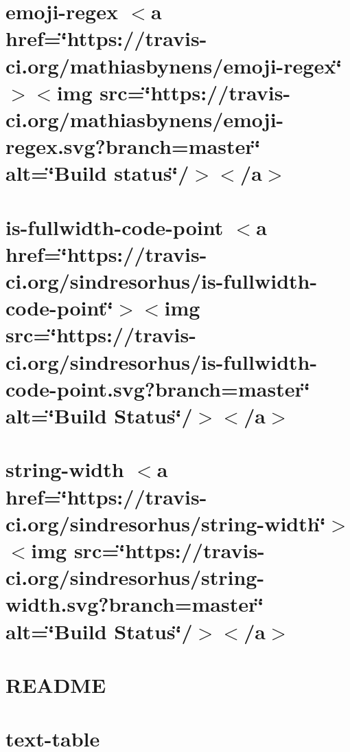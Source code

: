 \let\mypdfximage\pdfximage\def\pdfximage{\immediate\mypdfximage}\documentclass[twoside]{book}
\newcommand{\+}{\discretionary{\mbox{\scriptsize$\hookleftarrow$}}{}{}}
\begin{document}
\chapter{emoji-\/regex $<$a href=\char`\"{}https\+://travis-\/ci.\+org/mathiasbynens/emoji-\/regex\char`\"{}$>$$<$img src=\char`\"{}https\+://travis-\/ci.\+org/mathiasbynens/emoji-\/regex.\+svg?branch=master\char`\"{} alt=\char`\"{}\+Build status\char`\"{}/$>$$<$/a$>$}
\label{md_heap-visualizer_node_modules_table_node_modules_emoji-regex__r_e_a_d_m_e}

\chapter{is-\/fullwidth-\/code-\/point $<$a href=\char`\"{}https\+://travis-\/ci.\+org/sindresorhus/is-\/fullwidth-\/code-\/point\char`\"{}$>$$<$img src=\char`\"{}https\+://travis-\/ci.\+org/sindresorhus/is-\/fullwidth-\/code-\/point.\+svg?branch=master\char`\"{} alt=\char`\"{}\+Build Status\char`\"{}/$>$$<$/a$>$}
\label{md_heap-visualizer_node_modules_table_node_modules_is-fullwidth-code-point_readme}

\chapter{string-\/width $<$a href=\char`\"{}https\+://travis-\/ci.\+org/sindresorhus/string-\/width\char`\"{}$>$$<$img src=\char`\"{}https\+://travis-\/ci.\+org/sindresorhus/string-\/width.\+svg?branch=master\char`\"{} alt=\char`\"{}\+Build Status\char`\"{}/$>$$<$/a$>$}
\label{md_heap-visualizer_node_modules_table_node_modules_string-width_readme}

\chapter{R\+E\+A\+D\+ME}
\label{md_heap-visualizer_node_modules_table__r_e_a_d_m_e}

\chapter{text-\/table}
\label{md_heap-visualizer_node_modules_text-table_readme}

\end{document}
